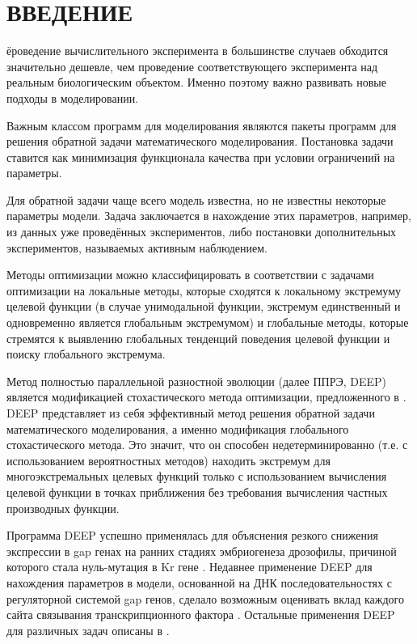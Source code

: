 \chapter*{ВВЕДЕНИЕ}

ёроведение вычислительного эксперимента
в большинстве случаев обходится значительно дешевле,
чем проведение соответствующего эксперимента
над реальным биологическим объектом.
Именно поэтому важно развивать новые подходы в моделировании.

Важным классом программ для моделирования
являются пакеты программ
для решения обратной задачи математического моделирования.
Постановка задачи ставится
как минимизация функционала качества
при условии ограничений на параметры.

Для обратной задачи чаще всего модель известна,
но не известны некоторые параметры модели.
Задача заключается в нахождение этих параметров,
например, из данных уже проведённых экспериментов,
либо постановки дополнительных экспериментов,
называемых активным наблюдением.

Методы оптимизации можно классифицировать
в соответствии с задачами оптимизации
на локальные методы,
которые сходятся к локальному экстремуму целевой функции
(в случае унимодальной функции,
экстремум единственный и одновременно
является глобальным экстремумом)
и глобальные методы,
которые стремятся к выявлению
глобальных тенденций поведения целевой функции
и поиску глобального экстремума.

Метод полностью параллельной разностной эволюции
(далее ППРЭ, DEEP) \cite{Kozlov11, Kozlov13}
является модификацией стохастического метода оптимизации,
предложенного в \cite{Storn95}.
DEEP представляет из себя эффективный метод
решения обратной задачи математического моделирования,
а именно модификация глобального стохастического метода.
Это значит, что он способен недетерминированно
(т.е. с использованием вероятностных методов)
находить экстремум для многоэкстремальных целевых функций
только с использованием вычисления целевой функции
в точках приближения без требования вычисления частных производных функции.

Программа DEEP успешно применялась для объяснения
резкого снижения экспрессии в gap генах
на ранних стадиях эмбриогенеза дрозофилы,
причиной которого стала нуль-мутация в Kr гене \cite{kozlov2012modeling}.
Недавнее применение DEEP для нахождения
параметров в модели, основанной на
ДНК последовательностях с
регуляторной системой gap генов,
сделало возможным оценивать
вклад каждого сайта связывания
транскрипционного фактора \cite{kozlov2014sequence}.
Остальные применения DEEP
для различных задач описаны в
\cite{kozlov2013enhanced, ivanisenko2014new,
ivanisenko2013replication, kozlov2015differential}.

